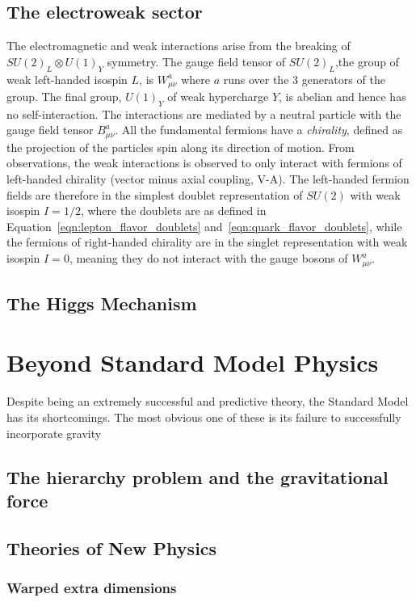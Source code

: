 \subsection{The electroweak sector}
The electromagnetic and weak interactions arise from the breaking of $SU (2)_L \otimes U(1)_Y$ symmetry. The gauge field tensor of $SU (2)_L$,the group of weak left-handed isospin $L$, is $W_{\mu\nu}^a$ where $a$ runs over the 3 generators of the group. The final group, $U(1)_Y$ of weak hypercharge $Y$, is abelian and hence has no self-interaction. The interactions are mediated by a neutral particle with the gauge field tensor $B_{\mu\nu}^a$.\newline
All the fundamental fermions have a \emph{chirality}, defined as the projection of the particles spin along its direction of motion. From observations, the weak interactions is observed to only interact with fermions of left-handed chirality (vector minus axial coupling, V-A). The left-handed fermion fields are therefore in the simplest doublet representation of $SU(2)$ with weak isospin $I=1/2$, where the doublets are as defined in Equation~\ref{eqn:lepton_flavor_doublets} and~\ref{eqn:quark_flavor_doublets}, while the fermions of right-handed chirality are in the singlet representation with weak isospin $I=0$, meaning they do not interact with the gauge bosons of $W_{\mu\nu}^a$.

\subsection{The Higgs Mechanism}
\section{Beyond Standard Model Physics}
Despite being an extremely successful and predictive theory, the Standard Model has its shortcomings. The most obvious one of these is its failure to successfully incorporate gravity
\subsection{The hierarchy problem and the gravitational force}
\subsection{Theories of New Physics}
\subsubsection{Warped extra dimensions}
\label{sec:theory:wed}

